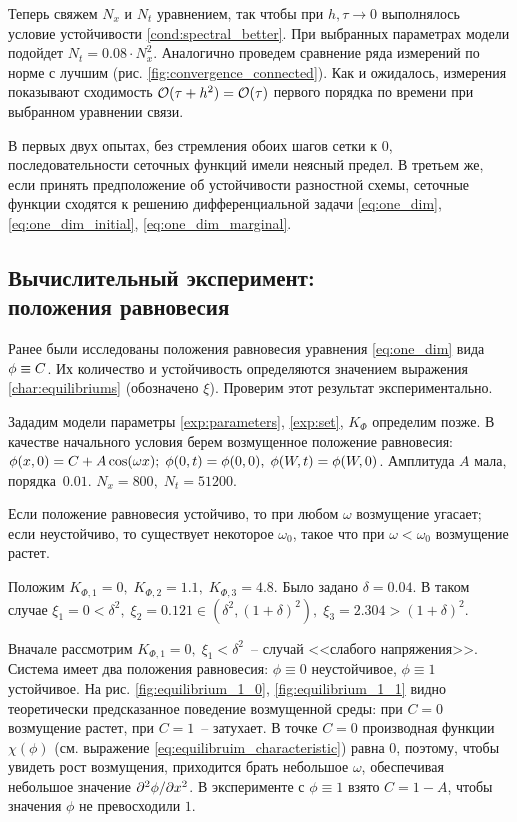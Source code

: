 Теперь свяжем $N_x$ и $N_t$ уравнением, так чтобы при $h, \tau \to 0$ выполнялось условие устойчивости \eqref{cond:spectral_better}. При выбранных параметрах модели подойдет $N_t = 0.08 \cdot N_x^2$. Аналогично проведем сравнение ряда измерений по норме с лучшим (рис. \ref{fig:convergence_connected}). Как и ожидалось, измерения показывают сходимость ${\mathcal{O}} (\tau + h^2) = {\mathcal{O}} (\tau)$ первого порядка по времени при выбранном уравнении связи.

В первых двух опытах, без стремления обоих шагов сетки к $0$, последовательности сеточных функций имели неясный предел. В третьем же, если принять предположение об устойчивости разностной схемы, сеточные функции сходятся к решению дифференциальной задачи \eqref{eq:one_dim}, \eqref{eq:one_dim_initial}, \eqref{eq:one_dim_marginal}.


\subsection{Вычислительный эксперимент: \\ положения равновесия}

Ранее были исследованы положения равновесия уравнения \eqref{eq:one_dim} вида $\phi \hm \equiv C$. Их количество и устойчивость определяются значением выражения \eqref{char:equilibriums} (обозначено $\xi$). Проверим этот результат экспериментально.

Зададим модели параметры \eqref{exp:parameters}, \eqref{exp:set}, $K_\Phi$ определим позже. В качестве начального условия берем возмущенное положение равновесия: $\phi(x, 0) = C \hm + A \cos(\omega x); \; \phi(0, t) = \phi(0, 0), \; \phi(W, t) = \phi(W, 0)$. Амплитуда $A$ мала, порядка~$0.01$. $N_x = 800, \; N_t = 51200$.

Если положение равновесия устойчиво, то при любом $\omega$ возмущение угасает; если неустойчиво, то существует некоторое $\omega_0$, такое что при $\omega < \omega_0$ возмущение растет.

Положим $K_{\Phi, 1} = 0, \; K_{\Phi, 2} = 1.1, \; K_{\Phi, 3} = 4.8$. Было задано $\delta = 0.04$. В таком случае $\xi_1 = 0 < \delta^2, \; \xi_2 = 0.121 \in (\delta^2, (1 + \delta)^2), \; \xi_3 = 2.304 > (1 + \delta)^2$.

Вначале рассмотрим $K_{\Phi, 1} = 0, \; \xi_1 < \delta^2$~-- случай <<слабого напряжения>>. Система имеет два положения равновесия: $\phi \equiv 0$ неустойчивое, $\phi \equiv 1$ устойчивое. На рис. \ref{fig:equilibrium_1_0}, \ref{fig:equilibrium_1_1} видно теоретически предсказанное поведение возмущенной среды: при $C = 0$ возмущение растет, при $C = 1$~-- затухает. В точке $C = 0$ производная функции $\chi(\phi)$ (см. выражение \eqref{eq:equilibruim_characteristic}) равна $0$, поэтому, чтобы увидеть рост возмущения, приходится брать небольшое $\omega$, обеспечивая небольшое значение $\partial^2 \phi / \partial x^2$. В эксперименте с $\phi \equiv 1$ взято $C = 1 - A$, чтобы значения $\phi$ не превосходили $1$.

